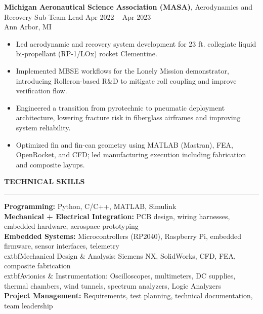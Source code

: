 \documentclass[10pt]{article}
\newcommand{\ressection}[1]{
  \vspace{0.25em}
  {\large\bfseries #1}\par
  \vspace{0.08em}\hrule\vspace{0.20em}
}
\begin{document}
{\bfseries Michigan Aeronautical Science Association (MASA)}, Aerodynamics and Recovery Sub-Team Lead \hfill Apr 2022 -- Apr 2023 \\
Ann Arbor, MI
\begin{itemize}
  \item Led aerodynamic and recovery system development for 23 ft. collegiate liquid bi-propellant (RP-1/LOx) rocket Clementine.
  \item Implemented MBSE workflows for the Lonely Mission demonstrator, introducing Rolleron-based R\&D to mitigate roll coupling and improve verification flow.
  \item Engineered a transition from pyrotechnic to pneumatic deployment architecture, lowering fracture risk in fiberglass airframes and improving system reliability.
  \item Optimized fin and fin-can geometry using MATLAB (Mastran), FEA, OpenRocket, and CFD; led manufacturing execution including fabrication and composite layups.
\end{itemize}

\ressection{TECHNICAL SKILLS}

\textbf{Programming:} Python, C/C++, MATLAB, Simulink \\
\textbf{Mechanical + Electrical Integration:} PCB design, wiring harnesses, embedded hardware, aerospace prototyping \\
\textbf{Embedded Systems:} Microcontrollers (RP2040), Raspberry Pi, embedded firmware, sensor interfaces, telemetry \\
	extbf{Mechanical Design \& Analysis:} Siemens NX, SolidWorks, CFD, FEA, composite fabrication \\
	extbf{Avionics \& Instrumentation:} Oscilloscopes, multimeters, DC supplies, thermal chambers, wind tunnels, spectrum analyzers, Logic Analyzers \\
\textbf{Project Management:} Requirements, test planning, technical documentation, team leadership
\end{document}
